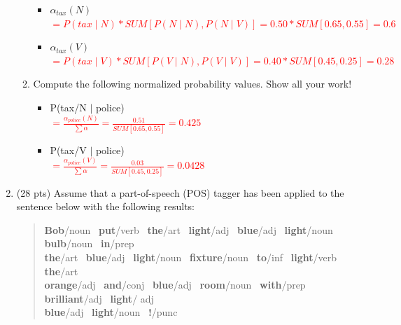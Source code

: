 \documentclass[11pt]{article}
\begin{document}
\begin{enumerate}
\begin{enumerate}
\begin{itemize}


\item $\alpha_{tax}(N)$ \\
\textcolor{red}{\quad  $=P(tax\mid N)*SUM[P(N \mid N),P(N \mid V)]=0.50 *SUM[0.65,0.55]= 0.6$}

\item $\alpha_{tax}(V)$ \\
\textcolor{red}{\quad  $=P(tax\mid V)*SUM[P(V \mid N),P(V \mid V)]=0.40 *SUM[0.45,0.25]= 0.28$}


\end{itemize}


\item Compute the following normalized probability values. Show all  your work! \\

\begin{itemize}

\item P(tax/N  $\mid$ police) \\
\textcolor{red}{\quad  $=\frac{\alpha_{police}(N)}{\sum\alpha}=\frac{0.51}{SUM[0.65,0.55]}= 0.425$}

\item P(tax/V  $\mid$ police) \\
\textcolor{red}{\quad  $=\frac{\alpha_{police}(V)}{\sum\alpha}=\frac{0.03}{SUM[0.45,0.25]}= 0.0428$}

\end{itemize}


\end{enumerate}



\newpage
\item (28 pts) Assume that a part-of-speech (POS) tagger has been applied to the
sentence below with the following results:

\begin{quote}
{\bf Bob}/{\sc noun~} {\bf put}/{\sc verb~} {\bf the}/{\sc art~} {\bf
  light}/{\sc adj~} {\bf blue}/{\sc adj~}
{\bf light}/{\sc noun~}  {\bf bulb}/{\sc noun~} {\bf in}/{\sc prep~} \\
{\bf the}/{\sc art~}  {\bf blue}/{\sc adj~}   {\bf light}/{\sc noun~}  {\bf fixture}/{\sc noun~}  
{\bf to}/{\sc inf~} {\bf light}/{\sc verb~} 
{\bf the}/{\sc art~} \\ {\bf orange}/{\sc adj~} 
  {\bf and}/{\sc conj~} {\bf blue}/{\sc adj~}  {\bf room}/{\sc noun~} 
{\bf with}/{\sc prep~} {\bf brilliant}/{\sc adj~} {\bf light}/{\sc
  adj~} \\
{\bf blue}/{\sc adj~} {\bf light}/{\sc noun~} {\bf !}/{\sc punc}
\end{quote}
\vspace*{.1in}


\end{enumerate}
\end{document}

